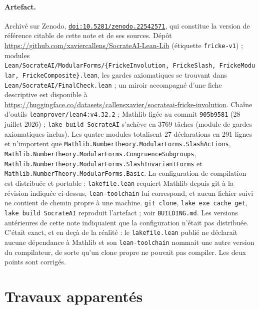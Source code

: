 \documentclass[11pt, a4paper]{article}
\newcommand{\brk}{\discretionary{}{}{}}
\theoremstyle{remark}
\begin{document}
\paragraph{Artefact.}
Archivé sur Zenodo, \href{https://doi.org/10.5281/zenodo.22542571}{\texttt{doi:10.5281/zenodo.22542571}},
qui constitue la version de référence citable de cette note et de ses sources.
Dépôt \url{https://github.com/xaviercallens/SocrateAI-Lean-Lib} (étiquette \texttt{fricke-v1}) ;
modules
\texttt{Lean/\brk SocrateAI/\brk ModularForms/\brk \{FrickeInvolution,\brk\ FrickeSlash,\brk\ FrickeModular,\brk\ FrickeComposite\}.lean},
les gardes axiomatiques se trouvant dans \texttt{Lean/\brk SocrateAI/\brk FinalCheck.lean} ;
un miroir accompagné d'une fiche descriptive est disponible à
\url{https://huggingface.co/datasets/callensxavier/socrateai-fricke-involution}.
Chaîne d'outils \texttt{leanprover/lean4:v4.32.2} ;
Mathlib figée au commit \texttt{905b9581} (28 juillet 2026) ;
\texttt{lake build SocrateAI} s'achève en 3769 tâches (module de gardes axiomatiques inclus).
Les quatre modules totalisent 27 déclarations en 291 lignes et n'importent que
\texttt{Mathlib.\allowbreak NumberTheory.\allowbreak ModularForms.\allowbreak SlashActions},
\texttt{Mathlib.\allowbreak NumberTheory.\allowbreak ModularForms.\allowbreak CongruenceSubgroups},
\texttt{Mathlib.\allowbreak NumberTheory.\allowbreak ModularForms.\allowbreak SlashInvariantForms} et
\texttt{Mathlib.\allowbreak NumberTheory.\allowbreak ModularForms.\allowbreak Basic}.
La configuration de compilation est distribuée et portable : \texttt{lakefile.lean} requiert Mathlib
depuis git à la révision indiquée ci-dessus, \texttt{lean-toolchain} lui correspond, et aucun fichier
suivi ne contient de chemin propre à une machine. \texttt{git clone}, \texttt{lake exe cache get},
\texttt{lake build SocrateAI} reproduit l'artefact ; voir \texttt{BUILDING.md}. Les versions
antérieures de cette note indiquaient que la configuration n'était pas distribuée. C'était exact, et
en deçà de la réalité : le \texttt{lakefile.lean} publié ne déclarait aucune dépendance à Mathlib et
son \texttt{lean-toolchain} nommait une autre version du compilateur, de sorte qu'un clone propre ne
pouvait pas compiler. Les deux points sont corrigés.

\section{Travaux apparentés}\label{sec:related}
\end{document}
